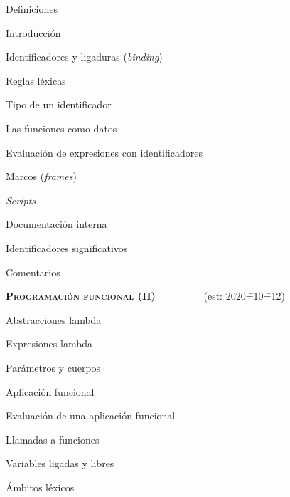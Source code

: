 \begin{longenum}
\begin{longenum}
\begin{longenum}
        \end{longenum}
        \item Definiciones
        \begin{longenum}
            \item Introducción
            \item Identificadores y ligaduras (\textit{binding})
            \begin{longenum}
                \item Reglas léxicas
                \item Tipo de un identificador
                \item Las funciones como datos
            \end{longenum}
            \item Evaluación de expresiones con identificadores
            \item Marcos (\textit{frames})
            \item \textit{Scripts}
        \end{longenum}
        \item Documentación interna
        \begin{longenum}
            \item Identificadores significativos
            \item Comentarios
        \end{longenum}
    \end{longenum}
    \item \textbf{\textsc{Programación funcional (II)}} \ \ \ \ \ \ \ \ \ (est: 2020\==10\==12)
    \begin{longenum}
        \item Abstracciones lambda
        \begin{longenum}
            \item Expresiones lambda
            \item Parámetros y cuerpos
            \item Aplicación funcional
            \begin{longenum}
                \item Evaluación de una aplicación funcional
                \item Llamadas a funciones
            \end{longenum}
            \item Variables ligadas y libres
        \end{longenum}
        \item Ámbitos léxicos

\end{longenum}
\end{longenum}
